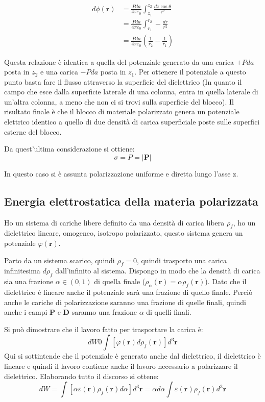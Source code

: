\documentclass[a4paper]{scrarticle}
\begin{document}
\begin{align*}
    d\phi(\bm r) &= \frac{Pda}{4\pi\varepsilon_0} \int_{z_1}^{z_2}\frac{dz\cos\theta}{r^2}\\
    &= \frac{Pda}{4\pi\varepsilon_0} \int_{r_1}^{r_2} - \frac{dr}{r^2}\\
    &= \frac{Pda}{4\pi\varepsilon_0} (\frac{1}{r_2}- \frac{1}{r_1})
\end{align*}

Questa relazione è identica  a quella del potenziale generato da una carica $+Pda$ posta in $z_2$ e una carica $-Pda$ posta in $z_1$.
Per ottenere il potenziale a questo punto basta fare il flusso attraverso la superficie del dielettrico (In quanto il campo che esce dalla superficie laterale di una colonna, entra in quella laterale di un'altra colonna, a meno che non ci si trovi sulla superficie del blocco).
Il risultato finale è che il blocco di materiale polarizzato genera un potenziale elettrico identico a quello di due densità di carica superficiale poste sulle superfici esterne del blocco.

Da quest'ultima considerazione si ottiene:
\begin{equation}
    \sigma  = P = |\bm P|
\end{equation}

In questo caso si è assunta polarizzazione uniforme e diretta lungo l'asse z.

\subsection{Energia elettrostatica della materia polarizzata}

Ho un sistema di cariche libere definito da una densità di carica libera $\rho_f$, ho un dielettrico lineare, omogeneo, isotropo polarizzato, questo sistema genera un potenziale $\varphi(\bm r)$.

Parto da un sistema scarico, quindi $\rho_f = 0$, quindi trasporto una carica infinitesima $d\rho_f$ dall'infinito al sistema. Dispongo in modo che la densità di carica sia una frazione $\alpha \in (0, 1)$ di quella finale ($\rho_\alpha (\bm r) = \alpha \rho_f (\bm r)$). Dato che il dielettrico è lineare anche il potenziale sarà una frazione di quello finale. Perciò anche le cariche di polarizzazione saranno una frazione di quelle finali, quindi anche i campi $\bm P$ e $\bm D$ saranno una frazione $\alpha$ di quelli finali.

Si può dimostrare che il lavoro fatto per trasportare la carica è:
\begin{equation*}
    dW 0 \int[\varphi (\bm r) d\rho_f(\bm r)] d^3\bm r
\end{equation*}
Qui si sottintende che il potenziale è generato anche dal dielettrico, il dielettrico è lineare e quindi il lavoro contiene anche il lavoro necessario a polarizzare il dielettrico.
Elaborando tutto il discorso si ottene:
\begin{equation*}
    dW = \int [\alpha\varepsilon(\bm r)\rho_f (\bm r)d\alpha]d^3\bm r = \alpha d\alpha \int \varepsilon(\bm r) \rho_f(\bm r) d^3 \bm r
\end{equation*}
\end{document}

